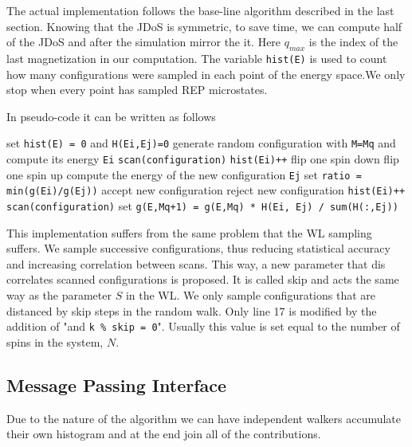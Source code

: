	The actual implementation follows the base-line algorithm described in the last section. Knowing that the JDoS is symmetric, to save time, we can compute half of the JDoS and after the simulation mirror the it. Here $q_{max}$ is the index of the last magnetization in our computation. The variable \texttt{hist(E)} is used to count how many configurations were sampled in each point of the energy space.We only stop when every point has sampled REP microstates.
	
	In pseudo-code it can be written as follows 
\begin{algorithm}
	\begin{algorithmic}[1]
		 	\State set \texttt{hist(E) = 0} and \texttt{H(Ei,Ej)=0}
		 	\State generate random configuration with \texttt{M=Mq} and compute its energy \texttt{Ei}
		 	\State \texttt{scan(configuration)}
		 	\State \texttt{hist(Ei)++}
		 		\State flip one spin down
		 		\State flip one spin up
		 		\State compute the energy of the new configuration \texttt{Ej}
		 		\State set \texttt{ratio = min(g(Ei)/g(Ej))}
					\State accept new configuration
				\Else
					\State reject new configuration
		 		\EndIf
		 			\State \texttt{hist(Ei)++}
			 		\State \texttt{scan(configuration)}
		 		\EndIf
		 	\EndWhile
		 	\State set \texttt{g(E,Mq+1) = g(E,Mq) * H(Ei, Ej) / sum(H(:,Ej))} 
		 \EndFor
	\end{algorithmic} 
\end{algorithm}

	This implementation suffers from the same problem that the WL sampling suffers. We sample successive configurations, thus reducing statistical accuracy and increasing correlation between scans. This way, a new parameter that dis correlates scanned configurations is proposed. It is called skip and acts the same way as the parameter $S$ in the WL. We only sample configurations that are distanced by skip steps in the random walk. Only line 17 is modified by the addition of "and \texttt{k \% skip = 0}". Usually this value is set equal to the number of spins in the system, $N$.

\subsection{Message Passing Interface}
 
	Due to the nature of the algorithm we can have independent walkers accumulate their own histogram and at the end join all of the contributions.
 
